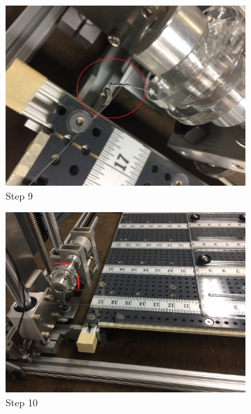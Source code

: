 \documentclass[titlepage,12pt,letter]{report}
\numberwithin{equation}{chapter}
\begin{document}
\begin{enumerate}[noitemsep,topsep=0pt]
\begin{figure}[H]
	\centering
	\begin{subfigure}[b]{.475\textwidth}
		\centering
		\includegraphics[width=\textwidth]{./Figures/Wire_mounting/9.jpg}
		\caption{Step 9}
	\end{subfigure}
	\begin{subfigure}[b]{.475\textwidth}
		\centering
		\includegraphics[width=\textwidth]{./Figures/Wire_mounting/10.jpg}
		\caption{Step 10}
	\end{subfigure}
	\centering
	\begin{subfigure}[b]{.475\textwidth}
		\centering

\end{subfigure}
\end{figure}
\end{enumerate}
\end{document}

